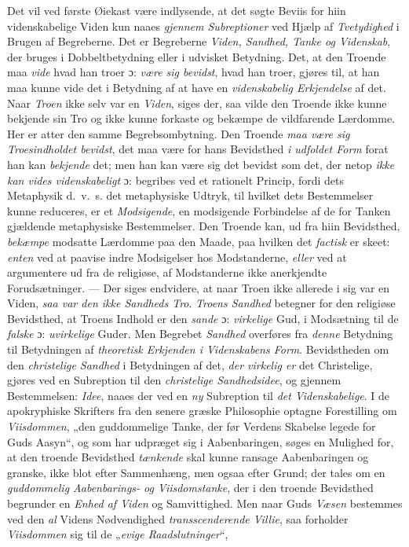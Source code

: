 \documentclass[12pt,a4paper]{book}
\newcommand{\opage}[1]{\marginnote{\footnotesize\textit{[#1]}}}
\begin{document}
Det vil ved første Øiekast være indlysende, at det søgte Beviis for hiin videnskabelige
Viden kun naaes \emph{gjennem Subreptioner} ved Hjælp af \emph{Tvetydighed} i Brugen af
Begreberne. Det er Begreberne \emph{Viden, Sandhed, Tanke og Videnskab}, der bruges i
Dobbeltbetydning eller i udvisket Betydning. Det, at den Troende maa \emph{vide} hvad han troer ɔ: \emph{være sig bevidst}, hvad han troer, gjøres til, at han maa kunne vide det i
Betydning af at have en \emph{videnskabelig Erkjendelse} af det. Naar \emph{Troen} ikke selv var en \emph{Viden}, siges der, saa vilde den Troende ikke kunne bekjende sin Tro og ikke kunne
forkaste og bekæmpe de vildfarende Lærdomme. Her er atter den samme Begrebsombytning. Den Troende \emph{maa være sig Troesindholdet bevidst}, det maa være for hans Bevidsthed \emph{i udfoldet Form} forat han kan \emph{bekjende} det; men han kan være sig det bevidst som det, der
netop \emph{ikke kan vides videnskabeligt} ɔ: begribes ved et rationelt Princip, fordi
dets Metaphysik d.\ v.\ s. det metaphysiske Udtryk, til hvilket dets Bestemmelser kunne
reduceres, \opage{103}er et \emph{Modsigende}, en modsigende Forbindelse af de for Tanken gjældende
metaphysiske Bestemmelser. Den Troende kan, ud fra hiin Bevidsthed, \emph{bekæmpe} modsatte Lærdomme paa den Maade, paa hvilken det \emph{factisk} er skeet: \emph{enten} ved at paavise indre Modsigelser hos Modstanderne, \emph{eller} ved at argumentere ud fra de religiøse, af
Modstanderne ikke anerkjendte Forudsætninger. --- Der siges endvidere, at naar Troen ikke
allerede i sig var en Viden, \emph{saa var den ikke Sandheds Tro}. \emph{Troens Sandhed} betegner
for den religiøse Bevidsthed, at Troens Indhold er den \emph{sande} ɔ: \emph{virkelige} Gud, i Modsætning til de \emph{falske} ɔ: \emph{uvirkelige} Guder. Men Begrebet
\emph{Sandhed} overføres fra \emph{denne} Betydning til Betydningen af \emph{theoretisk Erkjenden
i Videnskabens Form}. Bevidstheden om den \emph{christelige Sandhed} i Betydningen af det,
\emph{der virkelig er} det Christelige, gjøres ved en Subreption til den \emph{christelige
Sandhedsidee}, og gjennem Bestemmelsen: \emph{Idee}, naaes der ved en \emph{ny} Subreption
til \emph{det Videnskabelige}. I de apokryphiske Skrifters fra den senere græske
Philosophie optagne Forestilling om \emph{Viisdommen}, „den guddommelige Tanke, der før
Verdens Skabelse legede for Guds Aasyn“, og som har udpræget sig i Aabenbaringen, søges en
Mulighed for, at den troende Bevidsthed \emph{tænkende} skal kunne ransage Aabenbaringen
og granske, ikke blot efter Sammenhæng, men ogsaa efter Grund; der tales om en \emph{guddommelig Aabenbarings- og Viisdomstanke}, der i den troende Bevidsthed begrunder en \emph{Enhed af Viden} og Samvittighed. Men naar Guds \emph{Væsen} bestemmes ved den \emph{al} Videns Nødvendighed \emph{transscenderende Villie}, saa forholder \emph{Viisdommen} sig til de „\emph{evige Raadslutninger}“,
\end{document}
